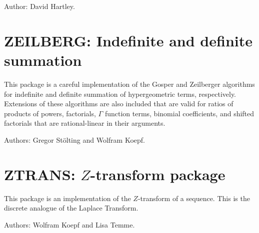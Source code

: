 Author: David Hartley.


\newpage

\section{ZEILBERG: Indefinite and definite summation}


This package is a careful implementation of the Gosper and Zeilberger
algorithms for indefinite and definite summation of hypergeometric terms,
respectively.  Extensions of these algorithms are also included that are
valid for ratios of products of powers, factorials, $\Gamma$ function
terms, binomial coefficients, and shifted factorials that are
rational-linear in their arguments.

Authors: Gregor St\"olting and Wolfram Koepf.


\newpage

\section{ZTRANS: \texorpdfstring{$Z$}{\textit{Z}}-transform package}


This package is an implementation of the $Z$-transform of a sequence.
This is the discrete analogue of the Laplace Transform.

Authors: Wolfram Koepf and Lisa Temme.


\let\sectionmark=\origsectionmark
